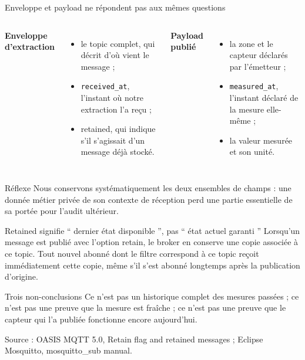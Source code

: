 \documentclass[aspectratio=169]{beamer}
\newcommand{\sourcefoot}[1]{\vfill\tiny\color{gray}Source : #1}
\begin{document}
\begin{frame}{Enveloppe et payload ne répondent pas aux mêmes questions}
\begin{columns}
\textbf{Enveloppe d'extraction}
\begin{itemize}
\item le topic complet, qui décrit d'où vient le message ;
\item \texttt{received\_at}, l'instant où notre extraction l'a reçu ;
\item retained, qui indique s'il s'agissait d'un message déjà stocké.
\end{itemize}
\textbf{Payload publié}
\begin{itemize}
\item la zone et le capteur déclarés par l'émetteur ;
\item \texttt{measured\_at}, l'instant déclaré de la mesure elle-même ;
\item la valeur mesurée et son unité.
\end{itemize}
\end{columns}
\begin{block}{Réflexe}
Nous conservons systématiquement les deux ensembles de champs : une donnée métier privée de son contexte de réception perd une partie essentielle de sa portée pour l'audit ultérieur.
\end{block}
\end{frame}

\begin{frame}{Retained signifie `` dernier état disponible '', pas `` état actuel garanti ''}
Lorsqu'un message est publié avec l'option retain, le broker en conserve une copie associée à ce topic. Tout nouvel abonné dont le filtre correspond à ce topic reçoit immédiatement cette copie, même s'il s'est abonné longtemps après la publication d'origine.
\begin{alertblock}{Trois non-conclusions}
Ce n'est pas un historique complet des mesures passées ; ce n'est pas une preuve que la mesure est fraîche ; ce n'est pas une preuve que le capteur qui l'a publiée fonctionne encore aujourd'hui.
\end{alertblock}
\sourcefoot{OASIS MQTT 5.0, Retain flag and retained messages ; Eclipse Mosquitto, mosquitto\_sub manual.}
\end{frame}
\end{document}

